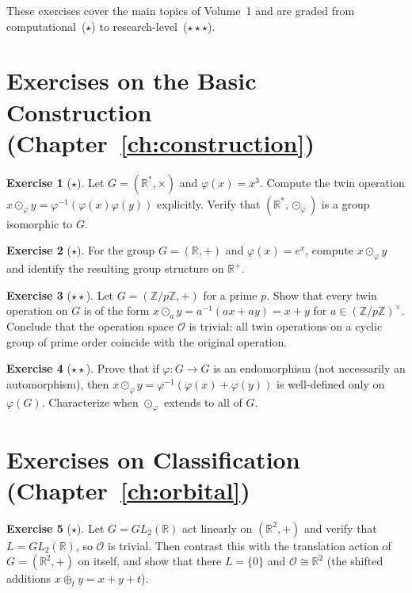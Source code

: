 \documentclass[11pt,a4paper,openany]{book}
\theoremstyle{plain}
\theoremstyle{definition}
\newtheorem{exercise}{Exercise}[chapter]
\newcommand{\twing}[1]{\odot_{#1}}
\newcommand{\opspace}{\mathcal{O}}
\newcommand{\lingroup}{L}
\newcommand{\RR}{\mathbb{R}}
\newcommand{\ZZ}{\mathbb{Z}}
\begin{document}
\noindent These exercises cover the main topics of Volume~1 and are graded from computational~($\star$) to research-level~($\star\star\star$).

\section*{Exercises on the Basic Construction (Chapter~\ref{ch:construction})}

\begin{exercise}[$\star$]
Let $G = (\RR^*, \times)$ and $\varphi(x) = x^3$. Compute the twin operation $x \twing{\varphi} y = \varphi^{-1}(\varphi(x)\varphi(y))$ explicitly. Verify that $(\RR^*, \twing{\varphi})$ is a group isomorphic to $G$.
\end{exercise}

\begin{exercise}[$\star$]
For the group $G = (\RR, +)$ and $\varphi(x) = e^x$, compute $x \twing{\varphi} y$ and identify the resulting group structure on $\RR^+$.
\end{exercise}

\begin{exercise}[$\star\star$]
Let $G = (\ZZ/p\ZZ, +)$ for a prime $p$. Show that every twin operation on $G$ is of the form $x \twing{a} y = a^{-1}(ax + ay) = x + y$ for $a \in (\ZZ/p\ZZ)^\times$. Conclude that the operation space $\opspace$ is trivial: all twin operations on a cyclic group of prime order coincide with the original operation.
\end{exercise}

\begin{exercise}[$\star\star$]
Prove that if $\varphi : G \to G$ is an endomorphism (not necessarily an automorphism), then $x \twing{\varphi} y = \varphi^{-1}(\varphi(x) + \varphi(y))$ is well-defined only on $\varphi(G)$. Characterize when $\twing{\varphi}$ extends to all of $G$.
\end{exercise}

\section*{Exercises on Classification (Chapter~\ref{ch:orbital})}

\begin{exercise}[$\star$]
Let $G=GL_2(\RR)$ act linearly on $(\RR^2,+)$ and verify that $\lingroup=GL_2(\RR)$, so $\opspace$ is trivial. Then contrast this with the translation action of $G=(\RR^2,+)$ on itself, and show that there $\lingroup=\{0\}$ and $\opspace\cong\RR^2$ (the shifted additions $x\oplus_t y=x+y+t$).
\end{exercise}
\end{document}

